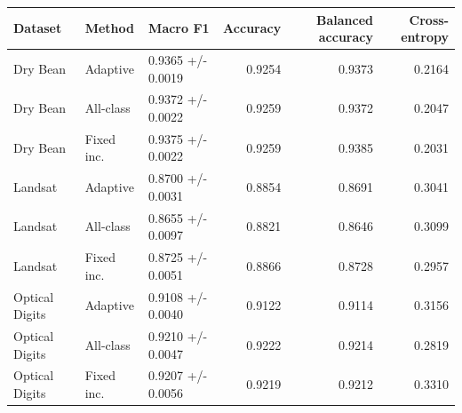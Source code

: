 \begin{tabular}{lllrrr}
\toprule
Dataset & Method & Macro F1 & Accuracy & Balanced accuracy & Cross-entropy \\
\midrule
Dry Bean & Adaptive & 0.9365 +/- 0.0019 & 0.9254 & 0.9373 & 0.2164 \\
Dry Bean & All-class & 0.9372 +/- 0.0022 & 0.9259 & 0.9372 & 0.2047 \\
Dry Bean & Fixed inc. & 0.9375 +/- 0.0022 & 0.9259 & 0.9385 & 0.2031 \\
Landsat & Adaptive & 0.8700 +/- 0.0031 & 0.8854 & 0.8691 & 0.3041 \\
Landsat & All-class & 0.8655 +/- 0.0097 & 0.8821 & 0.8646 & 0.3099 \\
Landsat & Fixed inc. & 0.8725 +/- 0.0051 & 0.8866 & 0.8728 & 0.2957 \\
Optical Digits & Adaptive & 0.9108 +/- 0.0040 & 0.9122 & 0.9114 & 0.3156 \\
Optical Digits & All-class & 0.9210 +/- 0.0047 & 0.9222 & 0.9214 & 0.2819 \\
Optical Digits & Fixed inc. & 0.9207 +/- 0.0056 & 0.9219 & 0.9212 & 0.3310 \\
\bottomrule
\end{tabular}

